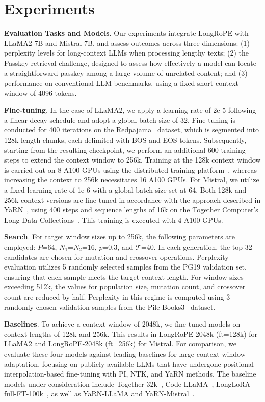  \section{Experiments}

\textbf{Evaluation Tasks and Models}. Our experiments integrate LongRoPE with LLaMA2-7B and Mistral-7B, and assess outcomes across three dimensions: (1) perplexity levels for long-context LLMs when processing lengthy texts; (2) the Passkey retrieval challenge, designed to assess how effectively a model can locate a straightforward passkey among a large volume of unrelated content; and (3) performance on conventional LLM benchmarks, using a fixed short context window of 4096 tokens.

\textbf{Fine-tuning}. In the case of LLaMA2, we apply a learning rate of 2e-5 following a linear decay schedule and adopt a global batch size of 32. Fine-tuning is conducted for 400 iterations on the Redpajama~\cite{redpajama} dataset, which is segmented into 128k-length chunks, each delimited with BOS and EOS tokens. Subsequently, starting from the resulting checkpoint, we perform an additional 600 training steps to extend the context window to 256k. Training at the 128k context window is carried out on 8 A100 GPUs using the distributed training platform~\cite{cube}, whereas increasing the context to 256k necessitates 16 A100 GPUs. For Mistral, we utilize a fixed learning rate of 1e-6 with a global batch size set at 64. Both 128k and 256k context versions are fine-tuned in accordance with the approach described in YaRN~\cite{yarn}, using 400 steps and sequence lengths of 16k on the Together Computer's Long-Data Collections~\cite{mistraldata}. This training is executed with 4 A100 GPUs.

\textbf{Search}. For target window sizes up to 256k, the following parameters are employed: $P$=64, $N_1$=$N_2$=16, $p$=0.3, and $\mathcal{T}$=40. In each generation, the top 32 candidates are chosen for mutation and crossover operations. Perplexity evaluation utilizes 5 randomly selected samples from the PG19 validation set, ensuring that each sample meets the target context length. For window sizes exceeding 512k, the values for population size, mutation count, and crossover count are reduced by half. Perplexity in this regime is computed using 3 randomly chosen validation samples from the Pile-Books3~\cite{pile} dataset.

\textbf{Baselines}. To achieve a context window of 2048k, we fine-tuned models on context lengths of 128k and 256k. This results in LongRoPE-2048k (ft=128k) for LLaMA2 and LongRoPE-2048k (ft=256k) for Mistral. For comparison, we evaluate these four models against leading baselines for large context window adaptation, focusing on publicly available LLMs that have undergone positional interpolation-based fine-tuning with PI, NTK, and YaRN methods. The baseline models under consideration include Together-32k~\cite{together}, Code LLaMA~\cite{codellama}, LongLoRA-full-FT-100k~\cite{longlora}, as well as YaRN-LLaMA and YaRN-Mistral~\cite{yarn}.

